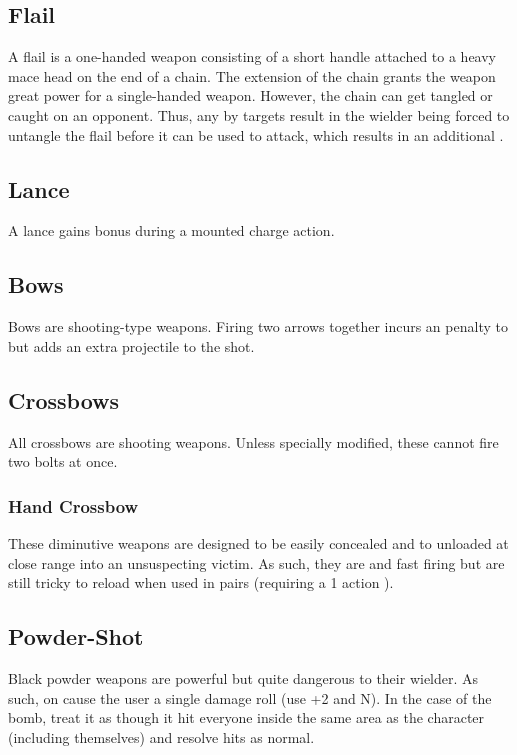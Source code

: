 \subsection{Flail}
A flail is a one-handed weapon consisting of a short handle attached to a heavy mace head on the end of a chain. The extension of the chain grants the weapon great power for a single-handed weapon. However, the chain can get tangled or caught on an opponent. Thus, any   by targets result in the wielder being forced to untangle the flail before it can be used to attack, which results in an additional . 

\subsection{Lance}
A lance gains bonus  during a mounted charge action.

\subsection{Bows}
Bows are shooting-type weapons. Firing two arrows together incurs an  penalty to  but adds an extra projectile to the shot.


\subsection{Crossbows}
All crossbows are shooting weapons. Unless specially modified, these cannot fire two bolts at once.

\subsubsection{Hand Crossbow}
These diminutive weapons are designed to be easily concealed and to unloaded at close range into an unsuspecting victim. As such, they are  and fast firing but are still tricky to reload when used in pairs (requiring a 1 action ).

\subsection{Powder-Shot}
Black powder weapons are powerful but quite dangerous to their wielder. As such,  on  cause the user a single damage roll (use  +2 and  N). In the case of the bomb, treat it as though it hit everyone inside the same area as the character (including themselves) and resolve hits as normal.

